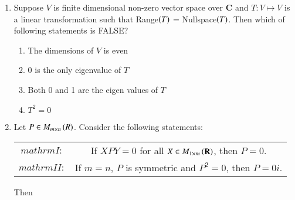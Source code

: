 \documentclass[journal]{IEEEtran}
\numberwithin{equation}{enumi}
\numberwithin{figure}{enumi}
\begin{document}
\begin{enumerate}
		\item
			Suppose $V$ is finite dimensional non-zero vector space over $\mathbf{C}$ and $T: V \mapsto V$ is a linear transformation such that Range$\left(T\right)$ = Nullspace$\left(T\right)$. Then which of following statements is FALSE?
		
		\begin{enumerate}
			\item The dimensions of $V$ is even 
			\item 0 is the only eigenvalue of $T$
			\item Both 0 and 1 are the eigen values of $T$
			\item $T^2 = 0$
		\end{enumerate}

		\item 
		Let $P \in M_{m \times n}\left(R\right)$. Consider the following statements:
		\begin{tabular}{c  c}
			$mathrm{I:}$ & If $XPY = 0$ for all $X \in M_{1 \times m}\left(\mathbf{R}\right)$, then $P = 0$.\\
			$mathrm{II:}$ & If $m = n$, $P$ is symmetric and $P^2 = 0$, then $P = 0i$. \\
		\end{tabular}
		Then 
		\begin{enumerate}
		\end{enumerate}


\end{enumerate}
\end{document}

